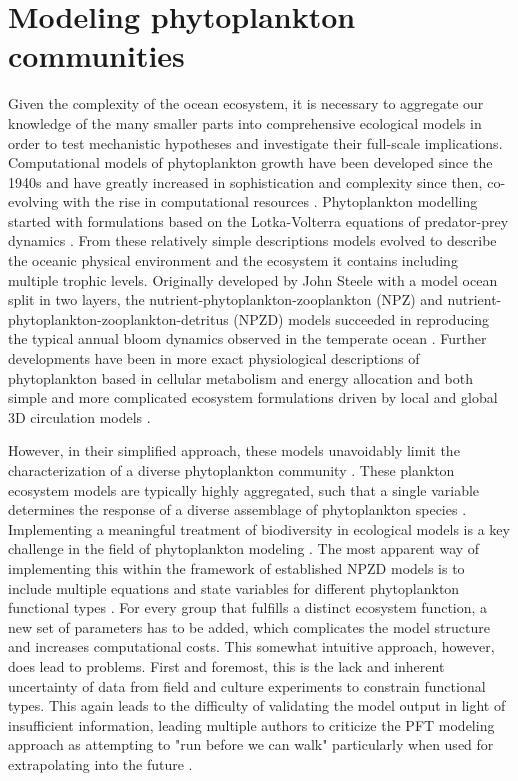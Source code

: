 \section{Modeling phytoplankton communities}
Given the complexity of the ocean ecosystem, it is necessary to aggregate our knowledge of the many smaller parts into comprehensive ecological models in order to test mechanistic hypotheses and investigate their full-scale implications. Computational models of phytoplankton growth have been developed since the 1940s and have greatly increased in sophistication and complexity since then, co-evolving with the rise in computational resources \citep{Gentleman2002a}. Phytoplankton modelling started with formulations based on the Lotka-Volterra equations of predator-prey dynamics \citep{Fleming1939}. From these relatively simple descriptions models evolved to describe the oceanic physical environment and the ecosystem it contains including multiple trophic levels. Originally developed by John Steele with a model ocean split in two layers, the nutrient-phytoplankton-zooplankton (NPZ) and nutrient-phytoplankton-zooplankton-detritus (NPZD) models succeeded in reproducing the typical annual bloom dynamics observed in the temperate ocean \citep{Steele1958,Evans1988,Fasham1990a}. Further developments have been in more exact physiological descriptions of phytoplankton based in cellular metabolism and energy allocation \citep{Geider1997} and both simple and more complicated ecosystem formulations driven by local and global 3D circulation models \citep{Lacroix2007, Hirata2013}.

However, in their simplified approach, these models unavoidably limit the characterization of a diverse phytoplankton community \citep{Bruggeman2009}. These plankton ecosystem models are typically highly aggregated, such that a single variable determines the response of a diverse assemblage of phytoplankton species \citep{Franks2009}. Implementing a meaningful treatment of biodiversity in ecological models is a key challenge in the field of phytoplankton modeling \citep{Queiros2015}. The most apparent way of implementing this within the framework of established NPZD models is to include multiple equations and state variables for different phytoplankton functional types \citep{LeQuere2005}. For every group that fulfills a distinct ecosystem function, a new set of parameters has to be added, which complicates the model structure and increases computational costs. This somewhat intuitive approach, however, does lead to problems. First and foremost, this is the lack and inherent uncertainty of data from field and culture experiments to constrain functional types. This again leads to the difficulty of validating the model output in light of insufficient information, leading multiple authors to criticize the PFT modeling approach as attempting to "run before we can walk" particularly when used for extrapolating into the future \citep{Anderson2005,Shimoda2016}. 

